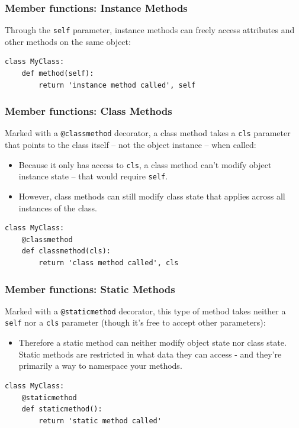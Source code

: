 \begin{frame}[fragile]\frametitle{Member functions: Instance Methods}

Through the \texttt{self} parameter, instance methods can freely access attributes and other
methods on the same object:
\begin{lstlisting}
class MyClass:
    def method(self):
        return 'instance method called', self
\end{lstlisting}

\end{frame}


\begin{frame}[fragile]\frametitle{Member functions: Class Methods}
Marked with a \texttt{@classmethod} decorator, a class method takes a \texttt{cls} parameter
that points to the class itself -- not the object instance -- when called:
  \begin{itemize}
  \item Because it only has access to \texttt{cls}, a class method can't modify object instance state -- that would require \texttt{self}.
  \item However, class methods can still modify class state that applies across all instances of the class.
  \end{itemize}
\begin{lstlisting}
class MyClass:
    @classmethod
    def classmethod(cls):
        return 'class method called', cls

\end{lstlisting}

\end{frame}

\begin{frame}[fragile]\frametitle{Member functions: Static Methods}
Marked with a \texttt{@staticmethod} decorator, this type of method takes neither a \texttt{self}
nor a \texttt{cls} parameter (though it's free to accept other parameters):
  \begin{itemize}
  \item Therefore a static method can neither modify object state nor class state. Static methods are restricted in what data they can access - and they're primarily a way to namespace your methods.
  \end{itemize}
\begin{lstlisting}
class MyClass:
    @staticmethod
    def staticmethod():
        return 'static method called'

\end{lstlisting}

\end{frame}

